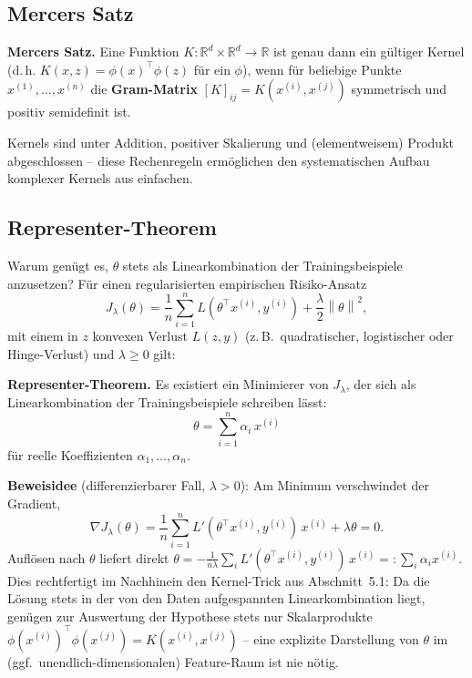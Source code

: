 \documentclass[11pt]{article}
\theoremstyle{csthm}
\theoremstyle{csdef}
\newcommand{\R}{\mathbb{R}}
\newcommand{\norm}[1]{\left\|#1\right\|}
\newcommand{\T}{^\top}
\begin{document}
\subsection{Mercers Satz}

\begin{tcolorbox}[thmstyle]
\textbf{Mercers Satz.}
Eine Funktion $K : \R^d \times \R^d \to \R$ ist genau dann ein gültiger
Kernel (d.\,h. $K(x,z) = \phi(x)\T\phi(z)$ für ein $\phi$), wenn für beliebige
Punkte $x^{(1)},\ldots,x^{(n)}$ die \textbf{Gram-Matrix}
$[K]_{ij} = K(x^{(i)}, x^{(j)})$ symmetrisch und positiv semidefinit ist.
\end{tcolorbox}

Kernels sind unter Addition, positiver Skalierung und (elementweisem) Produkt
abgeschlossen -- diese Rechenregeln ermöglichen den systematischen Aufbau
komplexer Kernels aus einfachen.

\subsection{Representer-Theorem}

Warum genügt es, $\theta$ stets als Linearkombination der Trainingsbeispiele
anzusetzen? Für einen regularisierten empirischen Risiko-Ansatz
\begin{equation}
  J_\lambda(\theta) = \frac{1}{n}\sum_{i=1}^n L(\theta\T x^{(i)}, y^{(i)})
    + \frac{\lambda}{2}\norm{\theta}^2,
\end{equation}
mit einem in $z$ konvexen Verlust $L(z,y)$ (z.\,B.\ quadratischer, logistischer
oder Hinge-Verlust) und $\lambda \geq 0$ gilt:

\begin{tcolorbox}[thmstyle]
\textbf{Representer-Theorem.} Es existiert ein Minimierer von $J_\lambda$,
der sich als Linearkombination der Trainingsbeispiele schreiben lässt:
\begin{equation}
  \theta = \sum_{i=1}^n \alpha_i\, x^{(i)}
\end{equation}
für reelle Koeffizienten $\alpha_1,\ldots,\alpha_n$.
\end{tcolorbox}

\textbf{Beweisidee} (differenzierbarer Fall, $\lambda>0$): Am Minimum
verschwindet der Gradient,
\[
  \nabla J_\lambda(\theta) = \frac1n\sum_{i=1}^n L'(\theta\T x^{(i)},y^{(i)})\,x^{(i)}
    + \lambda\theta = 0.
\]
Auflösen nach $\theta$ liefert direkt
$\theta = -\frac{1}{n\lambda}\sum_i L'(\theta\T x^{(i)},y^{(i)})\,x^{(i)}
=: \sum_i \alpha_i x^{(i)}$.
Dies rechtfertigt im Nachhinein den Kernel-Trick aus Abschnitt~5.1: Da die
Lösung stets in der von den Daten aufgespannten Linearkombination liegt,
genügen zur Auswertung der Hypothese stets nur Skalarprodukte
$\phi(x^{(i)})\T\phi(x^{(j)}) = K(x^{(i)}, x^{(j)})$ -- eine explizite
Darstellung von $\theta$ im (ggf.\ unendlich-dimensionalen) Feature-Raum ist
nie nötig.
\end{document}
